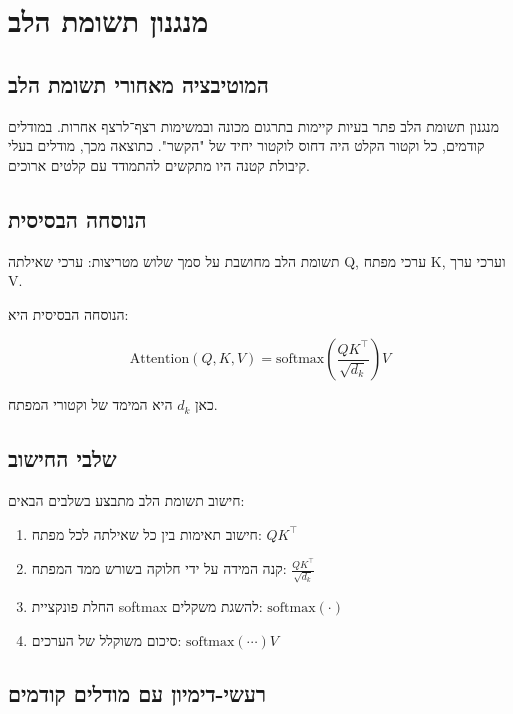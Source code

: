 \chapter{מנגנון תשומת הלב}

\section{המוטיבציה מאחורי תשומת הלב}

מנגנון תשומת הלב פתר בעיות קיימות בתרגום מכונה ובמשימות רצף־לרצף אחרות.
במודלים קודמים, כל וקטור הקלט היה דחוס לוקטור יחיד של "הקשר".
כתוצאה מכך, מודלים בעלי קיבולת קטנה היו מתקשים להתמודד עם קלטים ארוכים.

\section{הנוסחה הבסיסית}

תשומת הלב מחושבת על סמך שלוש מטריצות:
ערכי שאילתה \textenglish{Q}, ערכי מפתח \textenglish{K}, וערכי ערך \textenglish{V}.

הנוסחה הבסיסית היא:

\begin{equation}
\text{Attention}(Q, K, V) = \text{softmax}\left(\frac{QK^\top}{\sqrt{d_k}}\right)V
\end{equation}

כאן \(d_k\) היא המימד של וקטורי המפתח.

\section{שלבי החישוב}

חישוב תשומת הלב מתבצע בשלבים הבאים:

\begin{enumerate}
\item חישוב תאימות בין כל שאילתה לכל מפתח: \(QK^\top\)
\item קנה המידה על ידי חלוקה בשורש ממד המפתח: \(\frac{QK^\top}{\sqrt{d_k}}\)
\item החלת פונקציית \textenglish{softmax} להשגת משקלים: \(\text{softmax}(\cdot)\)
\item סיכום משוקלל של הערכים: \(\text{softmax}(\cdots) V\)
\end{enumerate}

\section{רעשי-דימיון עם מודלים קודמים}


